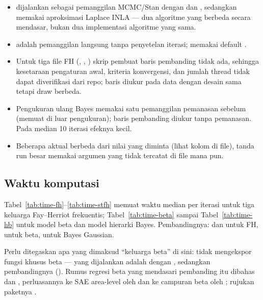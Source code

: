 \begin{itemize}
  \item {} dijalankan sebagai pemanggilan MCMC/Stan dengan
         dan , sedangkan 
        memakai aproksimasi Laplace INLA --- dua algoritme yang berbeda
        secara mendasar, bukan dua implementasi algoritme yang sama.
  \item {} adalah pemanggilan langsung tanpa
        penyetelan iterasi;  memakai default
        .
  \item Untuk tiga file FH (, , )
        skrip pembuat baris pembanding tidak ada, sehingga kesetaraan
        pengaturan awal, kriteria konvergensi, dan jumlah thread tidak dapat
        diverifikasi dari repo; baris  diukur pada data dengan
        desain sama tetapi draw berbeda.
  \item Pengukuran ulang Bayes memakai satu pemanggilan pemanasan sebelum
         (memuat  di luar pengukuran); baris
        pembanding diukur tanpa pemanasan. Pada median 10 iterasi efeknya
        kecil.
  \item Beberapa  aktual berbeda dari nilai yang diminta
        (lihat kolom  di file), tanda run besar memakai argumen
         yang tidak tercatat di file mana pun.
\end{itemize}

\subsection{Waktu komputasi}\label{sec:waktu}

Tabel~\ref{tab:time-fh}--\ref{tab:time-stfh} memuat waktu median per iterasi
untuk tiga keluarga Fay--Herriot frekuentis; Tabel~\ref{tab:time-beta}
sampai Tabel~\ref{tab:time-hb} untuk model beta dan model hierarki Bayes.
Pembandingnya:  dan  untuk FH,  untuk beta,
 untuk Bayes Gaussian.

Perlu ditegaskan apa yang dimaksud ``keluarga beta'' di sini: 
tidak mengekspor fungsi khusus beta --- yang dijalankan adalah
 dengan , sedangkan
pembandingnya  ().
Rumus regresi beta yang mendasari pembanding itu dibahas
\citet{ferrari2004beta} dan \citet{janicki2020beta}, perluasannya ke SAE
area-level oleh \citet{esteban2019compositional} dan ke campuran beta oleh
\citet{denicolo2024betamixture}; rujukan paketnya \citet{denicolo2024tipsae}.


